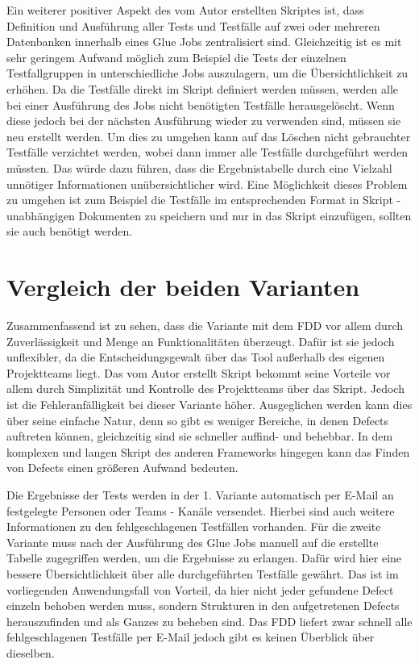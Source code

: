 Ein weiterer positiver Aspekt des vom Autor erstellten Skriptes ist, dass Definition und Ausführung aller Tests und Testfälle auf zwei oder mehreren Datenbanken innerhalb eines Glue Jobs zentralisiert sind. Gleichzeitig ist es mit sehr geringem Aufwand möglich zum Beispiel die Tests der einzelnen Testfallgruppen in unterschiedliche Jobs auszulagern, um die Übersichtlichkeit zu erhöhen.
\newline
Da die Testfälle direkt im Skript definiert werden müssen, werden alle bei einer Ausführung des Jobs nicht benötigten Testfälle herausgelöscht. Wenn diese jedoch bei der nächsten Ausführung wieder zu verwenden sind, müssen sie neu erstellt werden. Um  dies zu umgehen kann auf das Löschen nicht gebrauchter Testfälle verzichtet werden, wobei dann immer alle Testfälle durchgeführt werden müssten. Das würde dazu führen, dass die Ergebnistabelle durch eine Vielzahl unnötiger Informationen unübersichtlicher wird. 
Eine Möglichkeit dieses Problem zu umgehen ist zum Beispiel die Testfälle im entsprechenden Format in Skript - unabhängigen Dokumenten zu speichern und nur in das Skript einzufügen, sollten sie auch benötigt werden.

\section{Vergleich der beiden Varianten}
Zusammenfassend ist zu sehen, dass die Variante mit dem \ac{FDD} vor allem durch Zuverlässigkeit und Menge an Funktionalitäten überzeugt. Dafür ist sie jedoch unflexibler, da die Entscheidungsgewalt über das Tool außerhalb des eigenen Projektteams liegt. 
Das vom Autor erstellt Skript bekommt seine Vorteile vor allem durch Simplizität und Kontrolle des Projektteams über das Skript. Jedoch ist die Fehleranfälligkeit bei dieser Variante höher. Ausgeglichen werden kann dies über seine einfache Natur, denn so gibt es weniger Bereiche, in denen Defects auftreten können, gleichzeitig sind sie schneller auffind- und behebbar. 
In dem komplexen und langen Skript des anderen Frameworks hingegen kann das Finden von Defects einen größeren Aufwand bedeuten. 
\newline

Die Ergebnisse der Tests werden in der 1. Variante automatisch  per E-Mail an festgelegte Personen oder Teams - Kanäle versendet. Hierbei sind auch weitere Informationen zu den fehlgeschlagenen Testfällen vorhanden. Für die zweite Variante muss nach der Ausführung des Glue Jobs manuell auf die erstellte Tabelle zugegriffen werden, um die Ergebnisse zu erlangen. Dafür wird hier eine bessere Übersichtlichkeit über alle durchgeführten Testfälle gewährt. Das ist im vorliegenden Anwendungsfall von Vorteil, da hier nicht jeder gefundene Defect einzeln behoben werden muss, sondern Strukturen in den aufgetretenen Defects herauszufinden und als Ganzes zu beheben sind. Das \ac{FDD} liefert zwar schnell alle fehlgeschlagenen Testfälle per E-Mail jedoch gibt es keinen Überblick über dieselben.  
\newline

